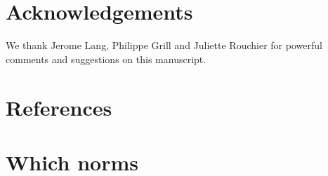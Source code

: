 \documentclass[preprint, french, english, 11pt, authoryear]{elsarticle}%
\newcommand{\commentOC}[1]{\textcolor{red}{OC: #1}}
\begin{document}



\section*{Acknowledgements}
We thank Jerome Lang, Philippe Grill and Juliette Rouchier for powerful comments and suggestions on this manuscript.

\section*{References}



\renewcommand*{\appendixname}{}
\appendix

\section{Which norms}
\label{sec-whichnorms}
\end{document}
